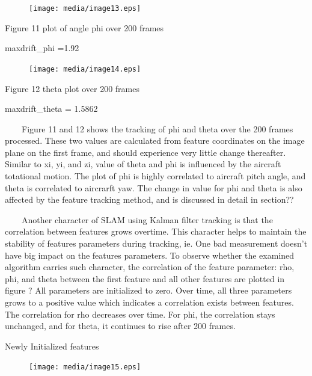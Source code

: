 \begin{figure}[h]
\centering
\texttt{[image: media/image13.eps]}
\end{figure}


\begin{center}Figure 11 plot of angle phi over 200 frames\end{center}

maxdrift\_phi =1.92

\begin{figure}[h]
\centering
\texttt{[image: media/image14.eps]}
\end{figure}


\begin{center}Figure 12 theta plot over 200 frames\end{center}

maxdrift\_theta = 1.5862

\ \ \ \ Figure 11 and 12 shows the tracking of phi and theta over the 
200 frames processed. These two values are calculated from feature 
coordinates on the image plane on the first frame, and should experience 
very little change thereafter. Similar to xi, yi, and zi, value of theta 
and phi is influenced by the aircraft totational motion. The plot of phi 
is highly correlated to aircraft pitch angle, and theta is correlated to 
aircrarft yaw. The change in value for phi and theta is also affected by 
the feature tracking method, and is discussed in detail in section??

\ \ \ \ Another character of SLAM using Kalman filter tracking is that 
the correlation between features grows overtime. This character helps to 
maintain the stability of features parameters during tracking, ie. One 
bad measurement doesn't have big impact on the features parameters. To 
observe whether the examined algorithm carries such character, the 
correlation of the feature parameter: rho, phi, and theta between the 
first feature and all other features are plotted in figure ? All 
parameters are initialized to zero. Over time, all three parameters 
grows to a positive value which indicates a correlation exists between 
features. The correlation for rho decreases over time. For phi, the 
correlation stays unchanged, and for theta, it continues to rise after 
200 frames. 

Newly Initialized features

\begin{figure}[h]
\centering
\texttt{[image: media/image15.eps]}
\end{figure}


